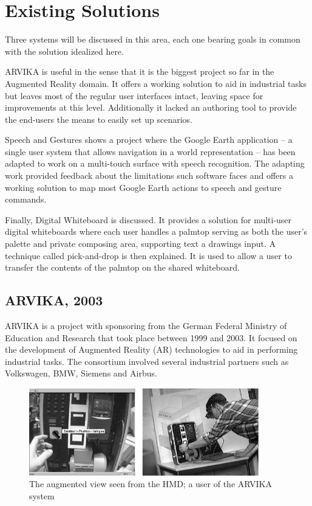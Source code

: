 \section{Existing Solutions}



Three systems will be discussed in this area, each one bearing goals in common
with the solution idealized here.

ARVIKA is useful in the sense that it is the biggest project so far in the
Augmented Reality domain. It offers a working solution to aid in industrial tasks but leaves most
of the regular user interfaces intact, leaving space for improvements at this level.
Additionally it lacked an authoring tool to provide the end-users the means to easily set up scenarios.

Speech and Gestures shows a project where the Google Earth \cite{SITE-EARTH} application
-- a single user system that allows navigation in a world representation -- has been adapted to
work on a multi-touch surface with speech recognition.
The adapting work provided feedback about the limitations such software faces 
and offers a working solution to map most Google Earth actions to speech and gesture commands.

Finally, Digital Whiteboard is discussed. It provides a solution for multi-user digital
whiteboards where each user handles a palmtop serving as both the user's palette and
private composing area, supporting text a drawings input.
A technique called pick-and-drop is then explained. It is used to allow a user to transfer
the contents of the palmtop on the shared whiteboard.



\subsection{ARVIKA, 2003}

ARVIKA \cite{ARVIKA} is a project with sponsoring from the
German Federal Ministry of Education and Research that took place between 1999 and 2003.
It focused on the development of Augmented Reality (AR) technologies to aid in performing industrial tasks.
The consortium involved several industrial partners such as Volkswagen, BMW, Siemens and Airbus.

\begin{figure}[!ht]
    \centering
    \includegraphics[width=10cm]{gfx/arvika.png}
    \caption{The augmented view seen from the HMD; a user of the ARVIKA system}
    \label{FIG-ARVIKA}
\end{figure}

